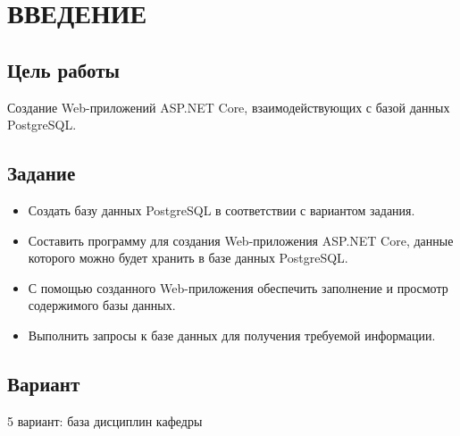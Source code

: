 \chapter{ВВЕДЕНИЕ}

\section{Цель работы}
Создание Web-приложений ASP.NET Core, взаимодействующих с базой данных PostgreSQL.

\section{Задание}

\begin{itemize}
	\item Создать базу данных PostgreSQL в соответствии с вариантом задания.
	\item Составить программу для создания Web-приложения ASP.NET Core, данные которого можно будет хранить в базе данных PostgreSQL.
	\item С помощью созданного Web-приложения обеспечить заполнение и просмотр содержимого базы данных.
	\item Выполнить запросы к базе данных для получения требуемой информации.
\end{itemize}

\section{Вариант}
5 вариант: база дисциплин кафедры
